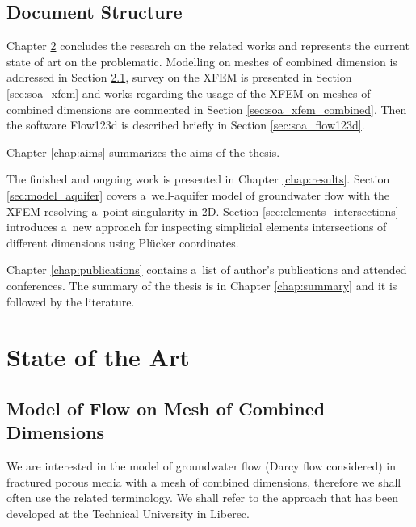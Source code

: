 \documentclass[FM,Dis]{tulthesis}
\begin{document}
\section{Document Structure} \label{sec:structure}

Chapter \ref{chap:soa} concludes the research on the related works and represents the current state of art
on the problematic. Modelling on meshes of combined dimension is addressed in Section \ref{sec:soa_model_combined},
survey on the XFEM is presented in Section \ref{sec:soa_xfem} and works regarding the usage of the XFEM on
meshes of combined dimensions are commented in Section \ref{sec:soa_xfem_combined}. Then 
the software Flow123d is described briefly in Section \ref{sec:soa_flow123d}.

Chapter \ref{chap:aims} summarizes the aims of the thesis.

The finished and ongoing work is presented in Chapter \ref{chap:results}. Section \ref{sec:model_aquifer} 
covers a~well-aquifer model of groundwater flow with the XFEM resolving a~point singularity in 2D.
Section \ref{sec:elements_intersections} introduces a~new approach for inspecting simplicial elements intersections
of different dimensions using Pl{\"u}cker coordinates.

Chapter \ref{chap:publications} contains a~list of author's publications and attended conferences.
The summary of the thesis is in Chapter \ref{chap:summary} and it is followed by the literature.




\chapter{State of the Art} \label{chap:soa}




\section{Model of Flow on Mesh of Combined Dimensions} \label{sec:soa_model_combined}

We are interested in the model of groundwater flow (Darcy flow considered) in fractured porous 
media with a mesh of combined dimensions, therefore we shall often use the related terminology.
We shall refer to the approach that has been developed at the Technical
University in Liberec. 
\end{document}

